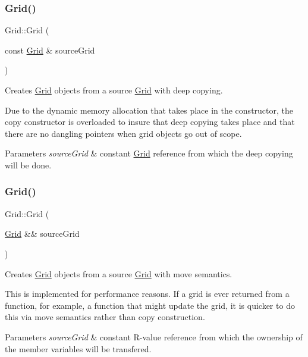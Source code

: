 \subsubsection{\texorpdfstring{Grid()}{Grid()}\hspace{0.1cm}{\footnotesize\ttfamily [2/3]}}
{\footnotesize\ttfamily Grid\+::\+Grid (\begin{DoxyParamCaption}\item[{const \hyperlink{class_grid}{Grid} \&}]{source\+Grid }\end{DoxyParamCaption})}



Creates \hyperlink{class_grid}{Grid} objects from a source \hyperlink{class_grid}{Grid} with deep copying. 

Due to the dynamic memory allocation that takes place in the constructor, the copy constructor is overloaded to insure that deep copying takes place and that there are no dangling pointers when grid objects go out of scope.


\begin{DoxyParams}{Parameters}
{\em source\+Grid} & constant \hyperlink{class_grid}{Grid} reference from which the deep copying will be done. \\
\hline
\end{DoxyParams}
\mbox{\label{class_grid_a3828d0bf34f6c97ed93adc84d4ce6c4b}} 
\subsubsection{\texorpdfstring{Grid()}{Grid()}\hspace{0.1cm}{\footnotesize\ttfamily [3/3]}}
{\footnotesize\ttfamily Grid\+::\+Grid (\begin{DoxyParamCaption}\item[{\hyperlink{class_grid}{Grid} \&\&}]{source\+Grid }\end{DoxyParamCaption})}



Creates \hyperlink{class_grid}{Grid} objects from a source \hyperlink{class_grid}{Grid} with move semantics. 

This is implemented for performance reasons. If a grid is ever returned from a function, for example, a function that might update the grid, it is quicker to do this via move semantics rather than copy construction.


\begin{DoxyParams}{Parameters}
{\em source\+Grid} & constant R-\/value reference from which the ownership of the member variables will be transfered. \\
\hline
\end{DoxyParams}
\mbox{\label{class_grid_a3661d0a7f998caaaf8627d7a67072116}} 
